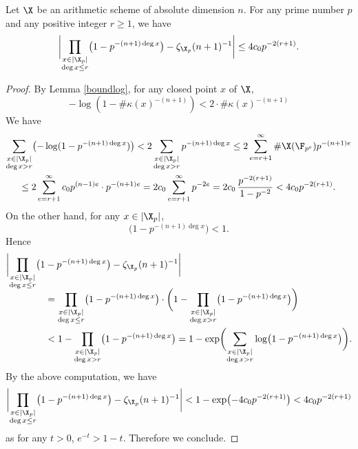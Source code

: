 \begin{lem}\label{zetafinite}
Let $\X$ be an arithmetic scheme of absolute dimension $n$. For any prime number $p$ and any positive integer $r\geq 1$, we have
\[
\biggl| \prod_{\substack{x\in |\X_{p}|\\ \deg x\leq r}} \bigl(1-p^{-(n+1)\deg x} \bigr) - \zeta_{\X_p}(n+1)^{-1} \biggr|\leq 4c_0 p^{-2(r+1)}.
\]
\end{lem}
\begin{proof}
By Lemma \ref{boundlog}, for any closed point $x$ of $\X$,
\[
- \log(1-\#\kappa(x)^{-(n+1)})<2\cdot\#\kappa(x)^{-(n+1)}
\]
We have
\begin{multline*}
\sum_{\substack{x\in |\X_{p}|\\ \deg x> r}}\bigl(- \log(1-p^{-(n+1)\deg x}) \bigr) < 2\sum_{\substack{x\in |\X_{p}|\\ \deg x> r}} p^{-(n+1)\deg x} \leq 2\sum_{e=r+1}^{\infty}\#\X(\F_{p^e}) p^{-(n+1)e} \\
\leq 2\sum_{e=r+1}^{\infty}c_0p^{(n-1)e}\cdot p^{-(n+1)e} 
= 2c_0\sum_{e=r+1}^{\infty} p^{-2e}= 2c_0\,\frac{p^{-2(r+1)}}{1-p^{-2}}< 4c_0p^{-2(r+1)}.
\end{multline*}
On the other hand, for any $x\in |\X_{p}|$,
\[
\bigl(1-p^{-(n+1)\deg x} \bigr)<1.
\]
Hence
\begin{align*}
\biggl| \prod_{\substack{x\in |\X_{p}|\\ \deg x\leq r}} \bigl(1&-p^{-(n+1)\deg x} \bigr) - \zeta_{\X_p}(n+1)^{-1} \biggr| \\[-5pt]
&= \prod_{\substack{x\in |\X_{p}|\\ \deg x\leq r}} \bigl(1-p^{-(n+1)\deg x} \bigr)\cdot \biggl(1- \prod_{\substack{x\in |\X_{p}|\\ \deg x> r}} \bigl(1-p^{-(n+1)\deg x} \bigr) \biggr) \\
&<1- \prod_{\substack{x\in |\X_{p}|\\ \deg x> r}} \bigl(1-p^{-(n+1)\deg x} \bigr) =1-\exp \biggl(\sum_{\substack{x\in |\X_{p}|\\ \deg x> r}} \log \bigl(1-p^{-(n+1)\deg x} \bigr) \biggr).
\end{align*}
By the above computation, we have
\[
\biggl | \prod_{\substack{x\in |\X_{p}|\\ \deg x\leq r}} \bigl(1-p^{-(n+1)\deg x} \bigr) - \zeta_{\X_p}(n+1)^{-1} \biggr|
< 1-\exp \bigl(-4c_0p^{-2(r+1)} \bigr) < 4c_0p^{-2(r+1)}
\]
as for any $t>0$, $e^{-t}>1-t$. Therefore we conclude.
\end{proof}

